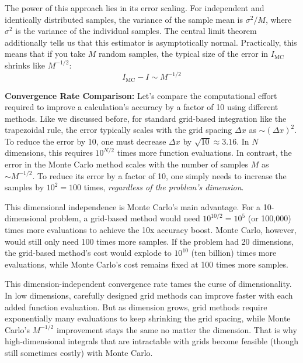 The power of this approach lies in its error scaling. For independent and identically distributed samples, the variance of the sample mean is $\sigma^2/M$, where $\sigma^2$ is the variance of the individual samples. The central limit theorem additionally tells us that this estimator is asymptotically normal. Practically, this means that if you take $M$ random samples, the typical size of the error in $I_{\text{MC}}$ shrinks like $M^{-1/2}$:
\begin{equation}
    I_{\text{MC}} - I \sim M^{-1/2}
\end{equation}

\begin{exampleBox}
    \textbf{Convergence Rate Comparison:} Let's compare the computational effort required to improve a calculation's accuracy by a factor of 10 using different methods. Like we discussed before, for standard grid-based integration like the trapezoidal rule, the error typically scales with the grid spacing $\Delta x$ as $\sim (\Delta x)^2$. To reduce the error by 10, one must decrease $\Delta x$ by $\sqrt{10} \approx 3.16$. In $N$ dimensions, this requires $10^{N/2}$ times more function evaluations. In contrast, the error in the Monte Carlo method scales with the number of samples $M$ as $\sim M^{-1/2}$. To reduce its error by a factor of 10, one simply needs to increase the samples by $10^2 = 100$ times, \emph{regardless of the problem's dimension}.
    
    This dimensional independence is Monte Carlo's main advantage. For a 10-dimensional problem, a grid-based method would need $10^{10/2} = 10^5$ (or 100,000) times more evaluations to achieve the 10x accuracy boost. Monte Carlo, however, would still only need 100 times more samples. If the problem had 20 dimensions, the grid-based method's cost would explode to $10^{10}$ (ten billion) times more evaluations, while Monte Carlo's cost remains fixed at 100 times more samples.
\end{exampleBox}

This dimension-independent convergence rate tames the curse of dimensionality. In low dimensions, carefully designed grid methods can improve faster with each added function evaluation. But as dimension grows, grid methods require exponentially many evaluations to keep shrinking the grid spacing, while Monte Carlo's $M^{-1/2}$ improvement stays the same no matter the dimension. That is why high-dimensional integrals that are intractable with grids become feasible (though still sometimes costly) with Monte Carlo.

